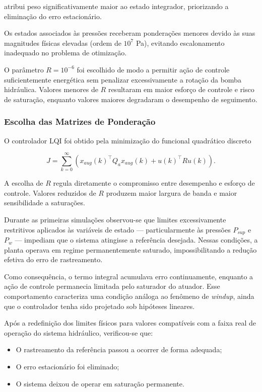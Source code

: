 atribui peso significativamente maior ao estado integrador, priorizando a eliminação do erro estacionário.

Os estados associados às pressões receberam ponderações menores devido às suas magnitudes físicas elevadas (ordem de $10^7$ Pa), evitando escalonamento inadequado no problema de otimização.

O parâmetro $R = 10^{-6}$ foi escolhido de modo a permitir ação de controle suficientemente energética sem penalizar excessivamente a rotação da bomba hidráulica. Valores menores de $R$ resultaram em maior esforço de controle e risco de saturação, enquanto valores maiores degradaram o desempenho de seguimento.

\subsubsection{Escolha das Matrizes de Ponderação}

O controlador LQI foi obtido pela minimização do funcional quadrático discreto

\begin{equation}
J = \sum_{k=0}^{\infty}
\left(
x_{aug}(k)^\top Q_a x_{aug}(k) +
u(k)^\top R u(k)
\right).
\end{equation}

A escolha de $R$ regula diretamente o compromisso entre desempenho e esforço de controle. Valores reduzidos de $R$ produzem maior largura de banda e maior sensibilidade a saturações.

Durante as primeiras simulações observou-se que limites excessivamente restritivos aplicados às variáveis de estado — particularmente às pressões $P_{sup}$ e $P_w$ — impediam que o sistema atingisse a referência desejada. Nessas condições, a planta operava em regime permanentemente saturado, impossibilitando a redução efetiva do erro de rastreamento.

Como consequência, o termo integral acumulava erro continuamente, enquanto a ação de controle permanecia limitada pelo saturador do atuador. Esse comportamento caracteriza uma condição análoga ao fenômeno de \textit{windup}, ainda que o controlador tenha sido projetado sob hipóteses lineares.

Após a redefinição dos limites físicos para valores compatíveis com a faixa real de operação do sistema hidráulico, verificou-se que:

\begin{itemize}
    \item O rastreamento da referência passou a ocorrer de forma adequada;
    \item O erro estacionário foi eliminado;
    \item O sistema deixou de operar em saturação permanente.
\end{itemize}

